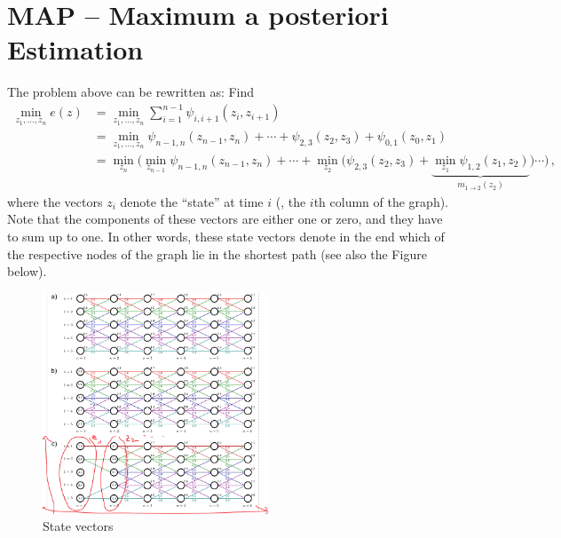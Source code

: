 \section*{MAP -- Maximum a posteriori Estimation}
The problem above can be rewritten as: Find
\begin{align*}
  \min_{z_1, \dotsc, z_n}e(z) &= \min_{z_1, \dotsc, z_n} \sum_{i=1}^{n-1} \psi_{i,i+1}(z_i, z_{i+1}) \\
                              &= \min_{z_1, \dotsc, z_n} \psi_{n-1,n}(z_{n-1}, z_n) + \dotsm + \psi_{2,3}(z_{2}, z_3) + \psi_{0,1}(z_{0}, z_1) \\
                              &= \min_{z_n}\Bigg(
                                \min_{z_{n-1}}\psi_{n-1,n}(z_{n-1},z_n) + \dotsm + \min_{z_2}\Big(
                                \psi_{2,3}(z_2, z_3) + \underbrace{\min_{z_1}\psi_{1,2}(z_1, z_2)}_{
                                m_{1\rightarrow 2}(z_2)
                                }
                                \Big) \dotsm
                                \Bigg)\,,
\end{align*}
where the vectors $z_i$ denote the ``state'' at time $i$ (\ie, the $i$th column
of the graph). Note that the components of these vectors are either one or zero,
and they have to sum up to one. In other words, these state vectors denote in
the end which of the respective nodes of the graph lie in the shortest path (see
also the Figure below).

\begin{figure}[htpb]
  \centering \includegraphics[width=0.6\textwidth]{Figures/state_vectors}
  \caption{State vectors}
\end{figure}


